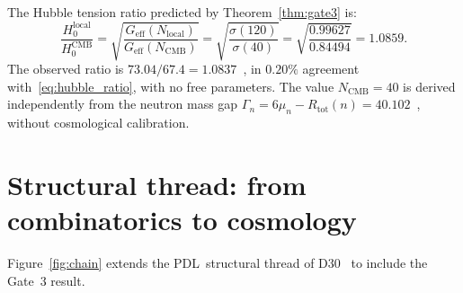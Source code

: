 \documentclass[11pt,a4paper]{article}
\theoremstyle{definition}
\newcommand{\PDL}{\textnormal{PDL}}
\newcommand{\Rtot}{R_{\mathrm{tot}}}
\newcommand{\Geff}{G_{\mathrm{eff}}}
\newcommand{\sig}{\sigma}
\newcommand{\Ncmb}{N_{\mathrm{CMB}}}
\newcommand{\Nlocal}{N_{\mathrm{local}}}
\begin{document}
\noindent The Hubble tension ratio predicted by Theorem~\ref{thm:gate3} is:
\begin{equation}
\frac{H_0^{\mathrm{local}}}{H_0^{\mathrm{CMB}}} = \sqrt{\frac{\Geff(\Nlocal)}{\Geff(\Ncmb)}} = \sqrt{\frac{\sig(120)}{\sig(40)}} = \sqrt{\frac{0.99627}{0.84494}} = 1.0859.
\label{eq:hubble_ratio}
\end{equation}
The observed ratio is $73.04/67.4 = 1.0837$~\cite{Riess_2022,Planck_2020}, in $0.20\%$ agreement with~\eqref{eq:hubble_ratio}, with no free parameters. The value $\Ncmb = 40$ is derived independently from the neutron mass gap $\Gamma_n = 6\mu_n - \Rtot(n) = 40.102$~\cite{NCMB_PDL_2026}, without cosmological calibration.

\section{Structural thread: from combinatorics to cosmology}
\label{sec:thread}

Figure~\ref{fig:chain} extends the \PDL\ structural thread of D30~\cite{PDL_D30_2026} to include the Gate~3 result.
\end{document}
